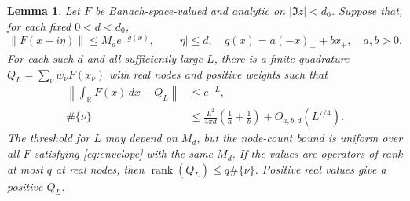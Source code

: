 \documentclass[11pt]{article}
\newtheorem{lemma}[theorem]{Lemma}
\numberwithin{equation}{section}
\newcommand{\rank}{\operatorname{rank}}
\newcommand{\R}{\mathbb R}
\begin{document}
\begin{lemma}\label{lem:gaussian}
Let $F$ be Banach-space-valued and analytic on $|\Im z|<d_0$. Suppose
that, for each fixed $0<d<d_0$,
\begin{equation}\label{eq:envelope}
 \|F(x+i\eta)\|\le M_d e^{-g(x)},\qquad |\eta|\le d,
 \quad g(x)=a(-x)_++b x_+,\quad a,b>0.
\end{equation}
For each such $d$ and all sufficiently large $L$, there is a finite
quadrature $Q_L=\sum_\nu w_\nu F(x_\nu)$ with real nodes and positive
weights such that
\begin{align}
 \left\|\int_\R F(x)\,dx-Q_L\right\|&\le e^{-L},  \label{eq:quadrature-error}\\
 \#\{\nu\}&\le
   \frac{L^2}{4\pi d}\left(\frac1a+\frac1b\right)
       +O_{a,b,d}(L^{7/4}).                           \label{eq:node-count}
\end{align}
The threshold for $L$ may depend on $M_d$, but the node-count bound is
uniform over all $F$ satisfying \eqref{eq:envelope} with the same $M_d$.
If the values are operators of rank at most $q$ at real nodes, then
$\rank(Q_L)\le q\#\{\nu\}$. Positive real values give a positive $Q_L$.
\end{lemma}
\end{document}
